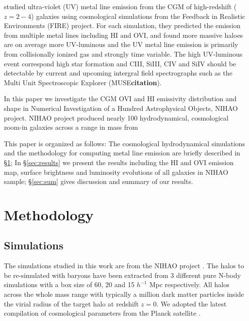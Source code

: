 \documentclass[useAMS,usenatbib]{mn2e}
\def \ion#1#2{#1{\footnotesize{#2}}\relax}
\def \hi       {\ion{H}{I}}
\def \ovi      {\ion{O}{VI}}
\begin{document}
\citet{Sravan15} studied ultra-violet (UV) metal line emission from the CGM
of high-redshift ($z=2-4$) galaxies using cosmological simulations from the 
Feedback in Realistic Environments (FIRE) project.
For each simulation, they predicted the emission from multiple metal lines
including \hi{} and \ovi{}, and found more massive haloes are on average 
more UV-luminous and the UV metal line emission is primarily from collisionally
ionized gas and strongly time variable. The high UV-luminous event correspond
high star formation and \ion{C}{III}, \ion{Si}{III}, \ion{C}{IV} and \ion{Si}{IV}
should be detectable by current and upcoming intergral field spectrographs such
as the Multi Unit Spectroscopic Explorer (MUSE{\bf citation}).

In this paper we investigate the CGM \ovi{} and \hi{} emissivity distribution
and shape in Numerical Investigation of a Hundred Astrophysical Objects,
NIHAO \citep{Wang15} project.
NIHAO project produced nearly 100 hydrodynamical, cosmological zoom-in galaxies
across a range in mass from

This paper is organized as follows: The cosmological hydrodynamical
simulations and the methodology for computing metal line emission
are briefly described in  \S\ref{sec:method}; In \S\ref{sec:results} 
we present the results including the \hi{} and \ovi{} emission map,
surface brightness and luminosity evolutions of all galaxies in NIHAO
sample; \S\ref{sec:sum} gives discussion and  summary of our
results.




\section{Methodology} 
\label{sec:method}

\subsection{Simulations}
\label{sec:sims}

The simulations studied in this work are from the NIHAO project \citep{Wang15}.  
The halos to be re-simulated with baryons have been extracted from 
3 different pure N-body simulations with a box size of 60, 20 and 
15 $h^{-1}$ Mpc respectively\citet{Dutton14}. 
All halos across the whole mass range with typically a million dark
matter particles inside the virial radius of the target halo at 
redshift $z=0$.  
We adopted the  latest compilation of cosmological
parameters from the Planck  satellite \citep{Planck14}. 
\end{document}
